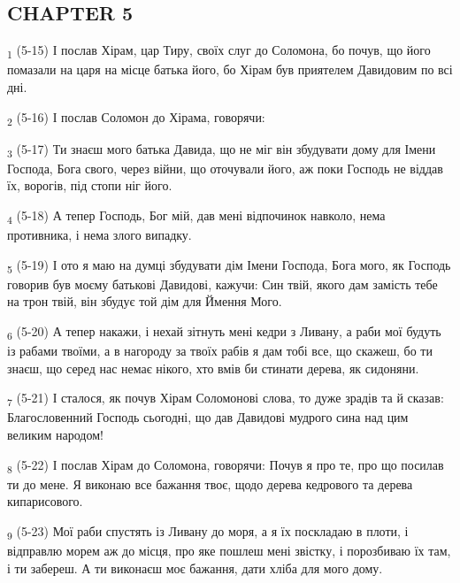 \subsection{CHAPTER 5}
\begin{tcolorbox}
\textsubscript{1} (5-15) І послав Хірам, цар Тиру, своїх слуг до Соломона, бо почув, що його помазали на царя на місце батька його, бо Хірам був приятелем Давидовим по всі дні.
\end{tcolorbox}
\begin{tcolorbox}
\textsubscript{2} (5-16) І послав Соломон до Хірама, говорячи:
\end{tcolorbox}
\begin{tcolorbox}
\textsubscript{3} (5-17) Ти знаєш мого батька Давида, що не міг він збудувати дому для Імени Господа, Бога свого, через війни, що оточували його, аж поки Господь не віддав їх, ворогів, під стопи ніг його.
\end{tcolorbox}
\begin{tcolorbox}
\textsubscript{4} (5-18) А тепер Господь, Бог мій, дав мені відпочинок навколо, нема противника, і нема злого випадку.
\end{tcolorbox}
\begin{tcolorbox}
\textsubscript{5} (5-19) І ото я маю на думці збудувати дім Імени Господа, Бога мого, як Господь говорив був моєму батькові Давидові, кажучи: Син твій, якого дам замість тебе на трон твій, він збудує той дім для Ймення Мого.
\end{tcolorbox}
\begin{tcolorbox}
\textsubscript{6} (5-20) А тепер накажи, і нехай зітнуть мені кедри з Ливану, а раби мої будуть із рабами твоїми, а в нагороду за твоїх рабів я дам тобі все, що скажеш, бо ти знаєш, що серед нас немає нікого, хто вмів би стинати дерева, як сидоняни.
\end{tcolorbox}
\begin{tcolorbox}
\textsubscript{7} (5-21) І сталося, як почув Хірам Соломонові слова, то дуже зрадів та й сказав: Благословенний Господь сьогодні, що дав Давидові мудрого сина над цим великим народом!
\end{tcolorbox}
\begin{tcolorbox}
\textsubscript{8} (5-22) І послав Хірам до Соломона, говорячи: Почув я про те, про що посилав ти до мене. Я виконаю все бажання твоє, щодо дерева кедрового та дерева кипарисового.
\end{tcolorbox}
\begin{tcolorbox}
\textsubscript{9} (5-23) Мої раби спустять із Ливану до моря, а я їх поскладаю в плоти, і відправлю морем аж до місця, про яке пошлеш мені звістку, і порозбиваю їх там, і ти забереш. А ти виконаєш моє бажання, дати хліба для мого дому.
\end{tcolorbox}
